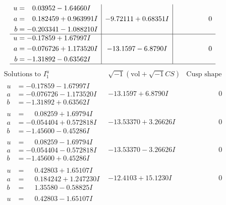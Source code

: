\documentclass[1p]{elsarticle_modified}
\theoremstyle{definition}
\newcommand{\I}{\sqrt{-1}}
\begin{document}
$$\begin{array}{c|c|c}
\begin{aligned}
u &= \phantom{-}0.03952 - 1.64660 I \\
a &= \phantom{-}0.182459 + 0.963991 I \\
b &= -0.203341 - 1.088210 I\end{aligned}
 & -9.72111 + 0.68351 I & \phantom{-0.000000 } 0 \\ \hline\begin{aligned}
u &= -0.17859 + 1.67997 I \\
a &= -0.076726 + 1.173520 I \\
b &= -1.31892 - 0.63562 I\end{aligned}
 & -13.1597 - 6.8790 I & \phantom{-0.000000 } 0\\
 \hline 
 \end{array}$$\newpage$$\begin{array}{c|c|c}  
\text{Solutions to }I^u_{1}& \I (\text{vol} + \sqrt{-1}CS) & \text{Cusp shape}\\
 \hline 
\begin{aligned}
u &= -0.17859 - 1.67997 I \\
a &= -0.076726 - 1.173520 I \\
b &= -1.31892 + 0.63562 I\end{aligned}
 & -13.1597 + 6.8790 I & \phantom{-0.000000 } 0 \\ \hline\begin{aligned}
u &= \phantom{-}0.08259 + 1.69794 I \\
a &= -0.054404 + 0.572818 I \\
b &= -1.45600 - 0.45286 I\end{aligned}
 & -13.53370 + 3.26626 I & \phantom{-0.000000 } 0 \\ \hline\begin{aligned}
u &= \phantom{-}0.08259 - 1.69794 I \\
a &= -0.054404 - 0.572818 I \\
b &= -1.45600 + 0.45286 I\end{aligned}
 & -13.53370 - 3.26626 I & \phantom{-0.000000 } 0 \\ \hline\begin{aligned}
u &= \phantom{-}0.42803 + 1.65107 I \\
a &= \phantom{-}0.184242 + 1.247230 I \\
b &= \phantom{-}1.35580 - 0.58825 I\end{aligned}
 & -12.4103 + 15.1230 I & \phantom{-0.000000 } 0 \\ \hline\begin{aligned}
u &= \phantom{-}0.42803 - 1.65107 I \\

\end{aligned}
\end{array}$$
\end{document}
